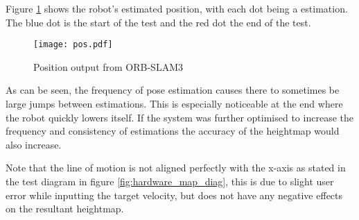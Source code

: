         Figure \ref{fig:hardware_pos} shows the robot's estimated position, with each dot being a estimation. The blue dot is the start of the test and the red dot the end of the test.
        \begin{figure}[h]
            \centering
            \texttt{[image: pos.pdf]}
            \caption{Position output from ORB-SLAM3}
            \label{fig:hardware_pos}
        \end{figure}

        \noindent
        As can be seen, the frequency of pose estimation causes there to sometimes be large jumps between estimations. This is especially noticeable at the end where the
        robot quickly lowers itself. If the system was further optimised to increase the frequency and consistency of estimations the accuracy of the heightmap
        would also increase.

        Note that the line of motion is not aligned perfectly with the x-axis as stated in the test diagram in figure \ref{fig:hardware_map_diag}, this is due to slight user
        error while inputting the target velocity, but does not have any negative effects on the resultant heightmap.
